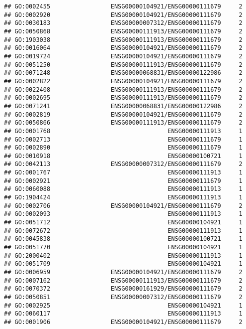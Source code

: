 \documentclass[
]{article}
\begin{document}
\begin{verbatim}
## GO:0002455                 ENSG00000104921/ENSG00000111679     2
## GO:0002920                 ENSG00000104921/ENSG00000111679     2
## GO:0030183                 ENSG00000007312/ENSG00000111679     2
## GO:0050868                 ENSG00000111913/ENSG00000111679     2
## GO:1903038                 ENSG00000111913/ENSG00000111679     2
## GO:0016064                 ENSG00000104921/ENSG00000111679     2
## GO:0019724                 ENSG00000104921/ENSG00000111679     2
## GO:0051250                 ENSG00000111913/ENSG00000111679     2
## GO:0071248                 ENSG00000068831/ENSG00000122986     2
## GO:0002822                 ENSG00000104921/ENSG00000111679     2
## GO:0022408                 ENSG00000111913/ENSG00000111679     2
## GO:0002695                 ENSG00000111913/ENSG00000111679     2
## GO:0071241                 ENSG00000068831/ENSG00000122986     2
## GO:0002819                 ENSG00000104921/ENSG00000111679     2
## GO:0050866                 ENSG00000111913/ENSG00000111679     2
## GO:0001768                                 ENSG00000111913     1
## GO:0002713                                 ENSG00000111679     1
## GO:0002890                                 ENSG00000111679     1
## GO:0010918                                 ENSG00000100721     1
## GO:0042113                 ENSG00000007312/ENSG00000111679     2
## GO:0001767                                 ENSG00000111913     1
## GO:0002921                                 ENSG00000111679     1
## GO:0060088                                 ENSG00000111913     1
## GO:1904424                                 ENSG00000111913     1
## GO:0002706                 ENSG00000104921/ENSG00000111679     2
## GO:0002093                                 ENSG00000111913     1
## GO:0051712                                 ENSG00000104921     1
## GO:0072672                                 ENSG00000111913     1
## GO:0045838                                 ENSG00000100721     1
## GO:0051770                                 ENSG00000104921     1
## GO:2000402                                 ENSG00000111913     1
## GO:0051709                                 ENSG00000104921     1
## GO:0006959                 ENSG00000104921/ENSG00000111679     2
## GO:0007162                 ENSG00000111913/ENSG00000111679     2
## GO:0070372                 ENSG00000161929/ENSG00000111679     2
## GO:0050851                 ENSG00000007312/ENSG00000111679     2
## GO:0002925                                 ENSG00000104921     1
## GO:0060117                                 ENSG00000111913     1
## GO:0001906                 ENSG00000104921/ENSG00000111679     2

\end{verbatim}
\end{document}
